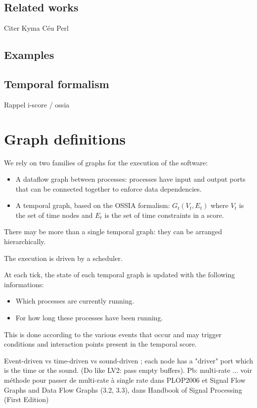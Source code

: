 \documentclass{article}
\begin{document}
    \subsection{Related works}
    Citer Kyma
    Céu
    Perl
    
    \subsection{Examples}
    
    \subsection{Temporal formalism}
    Rappel i-score / ossia
    
    
	\section{Graph definitions}
    We rely on two families of graphs for the execution of the software: 
    \begin{itemize}
        \item A dataflow graph between processes: processes have input and output ports that can be connected together to enforce data dependencies.
        \item A temporal graph, based on the OSSIA formalism: $G_t(V_t, E_t)$ where $V_t$ is the set of time nodes and $E_t$ is the set of time constraints in a score.
    \end{itemize}
    There may be more than a single temporal graph: they can be arranged hierarchically.
    
    The execution is driven by a scheduler. 
    
    At each tick, the state of each temporal graph is updated with the following informations: 
    \begin{itemize}
        \item Which processes are currently running.
        \item For how long these processes have been running.
    \end{itemize}

    This is done according to the various events that occur and may trigger conditions and interaction points present in the temporal score.
    
    Event-driven vs time-driven vs sound-driven ; each node has a "driver" port which is the time or the sound. (Do like LV2: pass empty buffers). Pb: multi-rate ... voir méthode pour passer de multi-rate à single rate dans PLOP2006 et Signal Flow Graphs and Data Flow Graphs (3.2, 3.3), dans Handbook of Signal Processing (First Edition)
    
\end{document}
